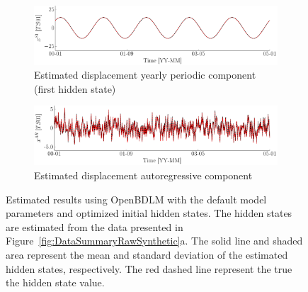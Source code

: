 \begin{figure}[h!]
\ContinuedFloat
\begin{subfigure}{\linewidth}
\includegraphics[width=0.9\linewidth]{./docfigs/Example_SYNTHETIC/optim_param_optim_initialhiddenstate/TS01_S1_4.pdf}
\caption{Estimated displacement yearly periodic component (first hidden state)}
\end{subfigure}
\begin{subfigure}{\linewidth}
\includegraphics[width=0.9\linewidth]{./docfigs/Example_SYNTHETIC/optim_param_optim_initialhiddenstate/TS01_AR_6.pdf} 
\caption{Estimated displacement autoregressive component}
\end{subfigure}
\caption{Estimated results using OpenBDLM with the default model parameters and optimized initial hidden states. The hidden states are estimated from the data presented in Figure~\ref{fig:DataSummaryRawSynthetic}a. The solid line and shaded area represent the mean and standard deviation of the estimated hidden states, respectively. The red dashed line represent the true the hidden state value.}
\label{fig:SYNTHETICOptimizedOptimized}
\end{figure}


